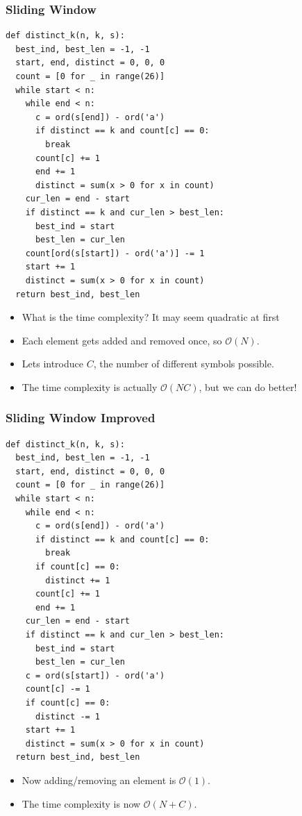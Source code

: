 \documentclass{beamer}
\begin{document}
\begin{frame}
    \frametitle{Sliding Window}
	\begin{tiny}
        \begin{verbatim}
def distinct_k(n, k, s):
  best_ind, best_len = -1, -1
  start, end, distinct = 0, 0, 0
  count = [0 for _ in range(26)]
  while start < n:
    while end < n:
      c = ord(s[end]) - ord('a')
      if distinct == k and count[c] == 0:
        break
      count[c] += 1
      end += 1
      distinct = sum(x > 0 for x in count)
    cur_len = end - start
    if distinct == k and cur_len > best_len:
      best_ind = start
      best_len = cur_len
    count[ord(s[start]) - ord('a')] -= 1
    start += 1
    distinct = sum(x > 0 for x in count)
  return best_ind, best_len
        \end{verbatim}
    \end{tiny}
    \vspace*{-0.3cm}
    \begin{itemize}
        \item<2-> What is the time complexity?  { It may seem quadratic at first}
        \item<4-> Each element gets added and removed once, so $\mathcal{O}(N)$.
        \item<5-> Lets introduce $C$, the number of different symbols possible.
        \item<6-> The time complexity is actually $\mathcal{O}(NC)$, but we can do better!
    \end{itemize}
\end{frame}


\begin{frame}
    \frametitle{Sliding Window Improved}
	\begin{tiny}
        \begin{verbatim}
def distinct_k(n, k, s):
  best_ind, best_len = -1, -1
  start, end, distinct = 0, 0, 0
  count = [0 for _ in range(26)]
  while start < n:
    while end < n:
      c = ord(s[end]) - ord('a')
      if distinct == k and count[c] == 0:
        break
      if count[c] == 0:
        distinct += 1
      count[c] += 1
      end += 1
    cur_len = end - start
    if distinct == k and cur_len > best_len:
      best_ind = start
      best_len = cur_len
    c = ord(s[start]) - ord('a')
    count[c] -= 1
    if count[c] == 0:
      distinct -= 1
    start += 1
    distinct = sum(x > 0 for x in count)
  return best_ind, best_len
        \end{verbatim}
    \end{tiny}
    \begin{itemize}
        \item<2-> Now adding/removing an element is $\mathcal{O}(1)$.
        \item<3-> The time complexity is now $\mathcal{O}(N + C)$.
    \end{itemize}
\end{frame}
\end{document}
